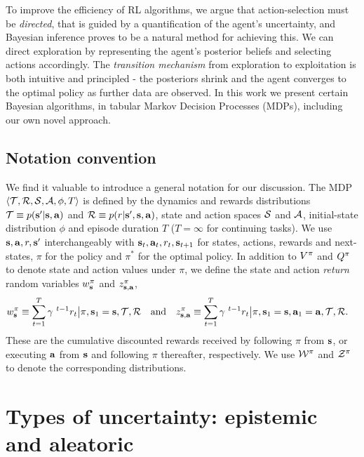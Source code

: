 \documentclass{article}
\begin{document}
To improve the efficiency of RL algorithms, we argue that action-selection must be \textit{directed}, that is guided by a quantification of the agent's uncertainty, and Bayesian inference proves to be a natural method for achieving this. We can direct exploration by representing the agent's posterior beliefs and selecting actions accordingly. The \textit{transition mechanism} from exploration to exploitation is both intuitive and principled - the posteriors shrink and the agent converges to the optimal policy as further data are observed. In this work we present certain Bayesian algorithms, in tabular Markov Decision Processes (MDPs), including our own novel approach.

\subsection{Notation convention}

We find it valuable to introduce a general notation for our discussion. The MDP $\langle \mathcal{T}, \mathcal{R}, \mathcal{S}, \mathcal{A}, \phi, T \rangle$ is defined by the dynamics and rewards distributions $\mathcal{T} \equiv p(\mathbf{s}' | \mathbf{s}, \mathbf{a})$ and $\mathcal{R} \equiv p(r | \mathbf{s}', \mathbf{s}, \mathbf{a})$, state and action spaces $\mathcal{S}$ and $\mathcal{A}$, initial-state distribution $\phi$ and episode duration $T$ ($T = \infty$ for continuing tasks). We use $\mathbf{s}, \mathbf{a}, r, \mathbf{s}'$ interchangeably with $\mathbf{s}_t, \mathbf{a}_t, r_t, \mathbf{s}_{t+1}$ for states, actions, rewards and next-states, $\pi$ for the policy and $\pi^*$ for the optimal policy. In addition to $V^{\pi}$ and $Q^{\pi}$ to denote state and action values under $\pi$, we define the state and action \textit{return} random variables $w^\pi_{\mathbf{s}}$ and $z^\pi_{\mathbf{s}, \mathbf{a}}$,
\begin{align}
w^\pi_{\mathbf{s}} \equiv \sum_{t = 1}^T \gamma^{~t - 1} r_t \big| \pi, \mathbf{s}_1 = \mathbf{s}, \mathcal{T}, \mathcal{R} ~~\text{ and }~~z^\pi_{\mathbf{s}, \mathbf{a}} &\equiv \sum_{t = 1}^T \gamma^{~t - 1} r_t \big| \pi, \mathbf{s}_1 = \mathbf{s}, \mathbf{a}_1 = \mathbf{a}, \mathcal{T}, \mathcal{R}.
\end{align}
These are the cumulative discounted rewards received by following $\pi$ from $\mathbf{s}$, or executing $\mathbf{a}$ from $\mathbf{s}$ and following $\pi$ thereafter, respectively. We use $\mathcal{W}^\pi$ and $\mathcal{Z}^\pi$ to denote the corresponding distributions.

\section{Types of uncertainty: epistemic and aleatoric}
\end{document}
